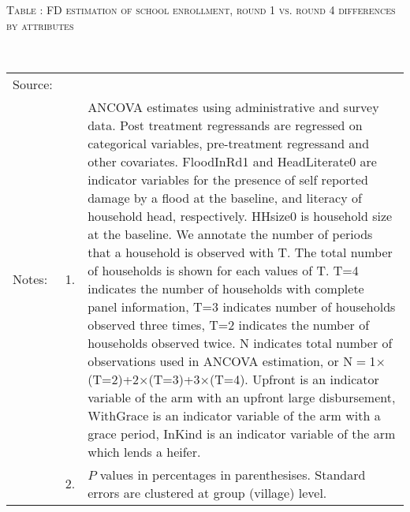 \hspace{-1cm}\begin{minipage}[t]{14cm}
\hfil\textsc{\normalsize Table \thetable: FD estimation of school enrollment, round 1 vs. round 4 differences by attributes\label{tab FD enroll5 attributes original HH}}\\
\setlength{\tabcolsep}{1pt}
\setlength{\baselineskip}{8pt}
\renewcommand{\arraystretch}{.55}
\hfil{}\\
\renewcommand{\arraystretch}{.8}
\setlength{\tabcolsep}{1pt}
\begin{tabular}{>{\hfill\scriptsize}p{1cm}<{}>{\hfill\scriptsize}p{.25cm}<{}>{\scriptsize}p{12cm}<{\hfill}}
Source:& \multicolumn{2}{l}{\scriptsize Estimated with GUK administrative and survey data.}\\
Notes: & 1. & ANCOVA estimates using administrative and survey data. Post treatment regressands are regressed on categorical variables, pre-treatment regressand and other covariates. \textsf{FloodInRd1} and \textsf{HeadLiterate0} are indicator variables for the presence of self reported damage by a flood at the baseline, and literacy of household head, respectively. \textsf{HHsize0} is household size at the baseline. We annotate the number of periods that a household is observed with \textsf{T}. The total number of households is shown for each values of \textsf{T}. \textsf{T=4} indicates the number of households with complete panel information, \textsf{T=3} indicates number of households observed three times, \textsf{T=2} indicates the number of households observed twice. \textsf{N} indicates total number of observations used in ANCOVA estimation, or \textsf{N$=$1$\times$(T=2)+2$\times$(T=3)+3$\times$(T=4)}.  \textsf{Upfront} is an indicator variable of the arm with an upfront large disbursement, \textsf{WithGrace} is an indicator variable of the arm with a grace period, \textsf{InKind} is an indicator variable of the arm which lends a heifer.\\
& 2. & $P$ values in percentages in parenthesises. Standard errors are clustered at group (village) level.
\end{tabular}
\end{minipage}



